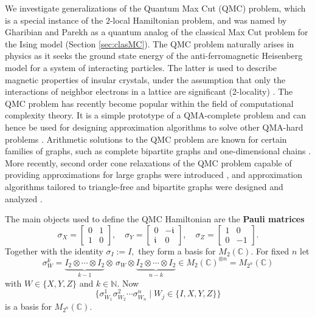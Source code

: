 \documentclass[12pt,dvipsnames,accepted=2016-08-18,a4paper,onecolumn]{quantumarticle}
\numberwithin{equation}{section}
\newcommand{\NN}{\mathbb N}
\newcommand{\CC}{\mathbb C}
\theoremstyle{definition}
\begin{document}
We investigate generalizations of the Quantum Max Cut (QMC) problem, which is a special instance of the $2$-local Hamiltonian problem, and was named by Gharibian and Parekh \cite{GP19} as a quantum analog of the classical Max Cut problem for the Ising model (Section \ref{sec:clasMC}). The QMC problem naturally arises in physics as it 
seeks the ground state energy of
the anti-ferromagnetic Heisenberg 
model for a system of interacting particles. 
The latter is used to describe magnetic properties of insular crystals, under the assumption that only the interactions of neighbor electrons in a lattice are significant (2-locality) \cite{Aue,BDZ}.
The QMC problem has recently become popular within the field of computational complexity theory. It is a simple prototype of a QMA-complete problem \cite{PM17} and can hence be used for designing approximation algorithms to solve other QMA-hard problems \cite{AMG20,PT21,PT22,Lee22,Kin23}. Arithmetic solutions to the QMC problem are known for certain families of graphs, such as complete bipartite graphs \cite{LM62} and one-dimensional chains \cite{LM16}.
More recently, second order cone relaxations of the QMC problem capable of providing approximations for large graphs were introduced \cite{HTPG}, and approximation algorithms tailored to triangle-free and  bipartite graphs were designed and analyzed \cite{gribling}.

The  main objects used to define the QMC Hamiltonian are the \textbf{Pauli matrices} 
\begin{equation}\label{eq:pauli}\tag{Pauli}
\sigma_X = 
\begin{bmatrix}
0 & 1 \\
1 & 0
\end{bmatrix},
\quad
\sigma_Y = 
\begin{bmatrix}
0 & -\mathfrak{i} \\
\mathfrak{i} & 0
\end{bmatrix},
\quad
\sigma_Z = 
\begin{bmatrix}
1 & 0 \\
0 & -1
\end{bmatrix}.
\end{equation}
Together with the identity $\sigma_I:=I,$ they form a basis for $M_2(\CC).$ For fixed $n$ let
\[\sigma_W^k = \underbrace{I_{2} \otimes \cdots\otimes I_2}_{k-1} \otimes\, \sigma_W \otimes \underbrace{I_{2} \otimes \cdots\otimes I_2}_{n-k} \in M_{2}(\CC)^{\otimes n}=M_{2^n}(\CC)\]
with $W\in\{X,Y,Z\}$ and $k\in\NN.$ Now 
\begin{equation}\label{eq:basis2}
    \{\sigma^1_{W_1} \sigma^2_{W_2}\cdots \sigma^n_{W_n} \mid W_j \in \{I,X,Y,Z\} \}
\end{equation}
is a basis for $M_{2^n}(\CC).$
\end{document}

